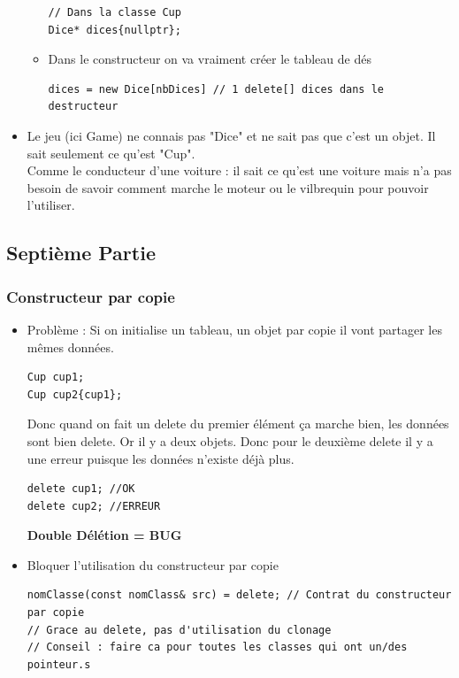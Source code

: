 \documentclass[12pt,a4paper]{article}
\begin{document}
\begin{itemize}
\begin{itemize}
\begin{lstlisting}
// Dans la classe Cup
Dice* dices{nullptr};
\end{lstlisting}
\item Dans le constructeur on va vraiment créer le tableau de dés
\begin{lstlisting}
dices = new Dice[nbDices] // 1 delete[] dices dans le destructeur
\end{lstlisting}
\end{itemize}
\item Le jeu (ici Game) ne connais pas "Dice" et ne sait pas que c'est un objet. Il sait seulement ce qu'est "Cup".\\
Comme le conducteur d'une voiture : il sait ce qu'est une voiture mais n'a pas besoin de savoir comment marche le moteur ou le vilbrequin pour pouvoir l'utiliser.
\end{itemize}

\subsection{Septième Partie}
\subsubsection{Constructeur par copie}
\begin{itemize}
\item Problème : Si on initialise un tableau, un objet par copie il vont partager les mêmes données.
\begin{lstlisting}
Cup cup1;
Cup cup2{cup1};
\end{lstlisting}
Donc quand on fait un delete du premier élément ça marche bien, les données sont bien delete. Or il y a deux objets. Donc pour le deuxième delete il y a une erreur puisque les données n'existe déjà plus.
\begin{lstlisting}
delete cup1; //OK
delete cup2; //ERREUR
\end{lstlisting} \textbf{Double Délétion = BUG}
\end{itemize}
\begin{itemize}
\item Bloquer l'utilisation du constructeur par copie 
\begin{lstlisting}
nomClasse(const nomClass& src) = delete; // Contrat du constructeur par copie 
// Grace au delete, pas d'utilisation du clonage
// Conseil : faire ca pour toutes les classes qui ont un/des pointeur.s
\end{lstlisting}
\end{itemize}
\end{document}
